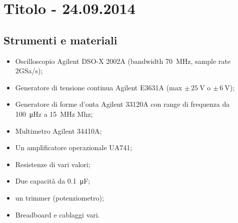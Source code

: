 \section{Titolo - 24.09.2014}

\subsection{Strumenti e materiali}

\begin{itemize} [noitemsep]
\item Oscilloscopio Agilent DSO-X 2002A (bandwidth \SI{70}{\mega\hertz}, sample rate 2GSa/s);
\item Generatore di tensione continua Agilent E3631A (max $\pm \, \SI{25}{\volt}$ o $\pm \, \SI{6}{\volt}$);
\item Generatore di forme d'onta Agilent 33120A con range di frequenza da \SI{100}{\micro\hertz} a \SI{15}{\mega\hertz} Mhz;
\item Multimetro Agilent 34410A;
\item Un amplificatore operazionale UA741;
\item Resistenze di vari valori;
\item Due capacità da \SI{0.1}{\micro\farad};
\item un trimmer (potenziometro);
\item Breadboard e cablaggi vari.
\end{itemize}